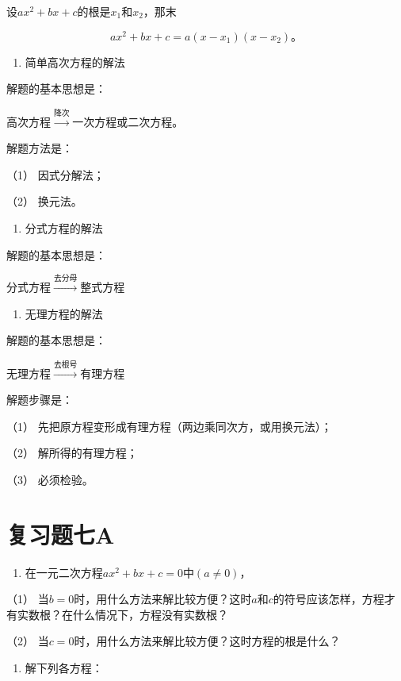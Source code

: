 设\(ax^2 + bx + c\)的根是\(x_1\)和\(x_2\)，那末

\[
a x ^ {2} + b x + c = a (x - x _ {1}) (x - x _ {2})\text{。}
\]

\begin{enumerate}[start=6]
\item
  简单高次方程的解法
\end{enumerate}

解题的基本思想是：

高次方程\(\xrightarrow{\text{降次}}\)一次方程或二次方程。

解题方法是：

（1） 因式分解法；

（2） 换元法。

\begin{enumerate}[start=7]
\item
  分式方程的解法
\end{enumerate}

解题的基本思想是：

分式方程\(\xrightarrow{\text{去分母}}\)整式方程

\begin{enumerate}[start=8]
\item
  无理方程的解法
\end{enumerate}

解题的基本思想是：

无理方程\(\xrightarrow{\text{去根号}}\)有理方程

解题步骤是：

（1） 先把原方程变形成有理方程（两边乘同次方，或用换元法）；

（2） 解所得的有理方程；

（3） 必须检验。

\section{复习题七A}

\begin{enumerate}
\item
  在一元二次方程\(ax^2 + bx + c = 0\)中\((a \neq 0)\)，
\end{enumerate}

（1）
当\(b = 0\)时，用什么方法来解比较方便？这时\(a\)和\(c\)的符号应该怎样，方程才有实数根？在什么情况下，方程没有实数根？

（2） 当\(c = 0\)时，用什么方法来解比较方便？这时方程的根是什么？

\begin{enumerate}[start=2]
\item
  解下列各方程：
\end{enumerate}

